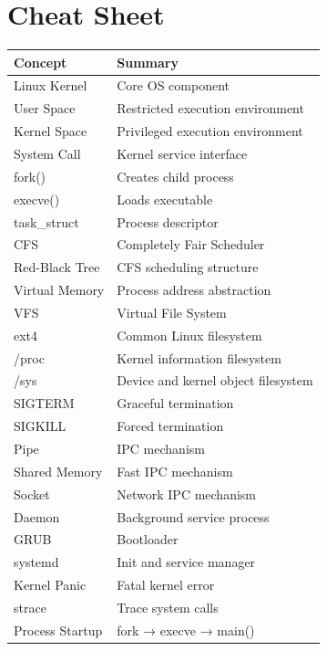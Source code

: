\section{Cheat Sheet}

\begin{longtable}{|p{5cm}|p{8cm}|}
\hline
Concept & Summary \\
\hline
Linux Kernel & Core OS component \\
\hline
User Space & Restricted execution environment \\
\hline
Kernel Space & Privileged execution environment \\
\hline
System Call & Kernel service interface \\
\hline
fork() & Creates child process \\
\hline
execve() & Loads executable \\
\hline
task\_struct & Process descriptor \\
\hline
CFS & Completely Fair Scheduler \\
\hline
Red-Black Tree & CFS scheduling structure \\
\hline
Virtual Memory & Process address abstraction \\
\hline
VFS & Virtual File System \\
\hline
ext4 & Common Linux filesystem \\
\hline
/proc & Kernel information filesystem \\
\hline
/sys & Device and kernel object filesystem \\
\hline
SIGTERM & Graceful termination \\
\hline
SIGKILL & Forced termination \\
\hline
Pipe & IPC mechanism \\
\hline
Shared Memory & Fast IPC mechanism \\
\hline
Socket & Network IPC mechanism \\
\hline
Daemon & Background service process \\
\hline
GRUB & Bootloader \\
\hline
systemd & Init and service manager \\
\hline
Kernel Panic & Fatal kernel error \\
\hline
strace & Trace system calls \\
\hline
Process Startup & fork → execve → main() \\
\hline
\end{longtable}